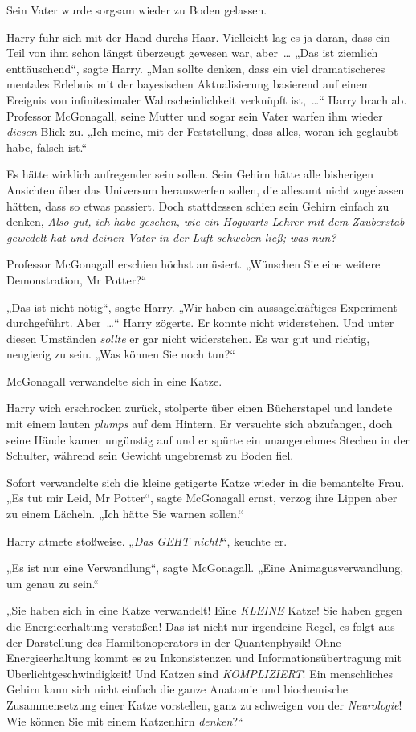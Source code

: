 {Sein Vater wurde sorgsam wieder zu Boden gelassen.

Harry fuhr sich mit der Hand durchs Haar. Vielleicht lag es ja daran, dass ein Teil von ihm schon längst überzeugt gewesen war, aber~… „Das ist ziemlich enttäuschend“, sagte Harry. „Man sollte denken, dass ein viel dramatischeres mentales Erlebnis mit der bayesischen Aktualisierung basierend auf einem Ereignis von infinitesimaler Wahrscheinlichkeit verknüpft ist,~…“ Harry brach ab. Professor McGonagall, seine Mutter und sogar sein Vater warfen ihm wieder \emph{diesen} Blick zu. „Ich meine, mit der Feststellung, dass alles, woran ich geglaubt habe, falsch ist.“

Es hätte wirklich aufregender sein sollen. Sein Gehirn hätte alle bisherigen Ansichten über das Universum herauswerfen sollen, die allesamt nicht zugelassen hätten, dass so etwas passiert. Doch stattdessen schien sein Gehirn einfach zu denken, \emph{Also gut, ich habe gesehen, wie ein Hogwarts-Lehrer mit dem Zauberstab gewedelt hat und deinen Vater in der Luft schweben ließ; was nun?}

Professor McGonagall erschien höchst amüsiert. „Wünschen Sie eine weitere Demonstration, Mr Potter?“

„Das ist nicht nötig“, sagte Harry. „Wir haben ein aussagekräftiges Experiment durchgeführt. Aber~…“ Harry zögerte. Er konnte nicht widerstehen. Und unter diesen Umständen \emph{sollte} er gar nicht widerstehen. Es war gut und richtig, neugierig zu sein. „Was können Sie noch tun?“

McGonagall verwandelte sich in eine Katze.

Harry wich erschrocken zurück, stolperte über einen Bücherstapel und landete mit einem lauten \emph{plumps} auf dem Hintern. Er versuchte sich abzufangen, doch seine Hände kamen ungünstig auf und er spürte ein unangenehmes Stechen in der Schulter, während sein Gewicht ungebremst zu Boden fiel.

Sofort verwandelte sich die kleine getigerte Katze wieder in die bemantelte Frau. „Es tut mir Leid, Mr Potter“, sagte McGonagall ernst, verzog ihre Lippen aber zu einem Lächeln. „Ich hätte Sie warnen sollen.“

Harry atmete stoßweise. „\emph{Das GEHT nicht!}“, keuchte er.

„Es ist nur eine Verwandlung“, sagte McGonagall. „Eine Animagusverwandlung, um genau zu sein.“

„Sie haben sich in eine Katze verwandelt! Eine \emph{KLEINE} Katze! Sie haben gegen die Energieerhaltung verstoßen! Das ist nicht nur irgendeine Regel, es folgt aus der Darstellung des Hamiltonoperators in der Quantenphysik! Ohne Energieerhaltung kommt es zu Inkonsistenzen und Informationsübertragung mit Überlichtgeschwindigkeit! Und Katzen sind \emph{KOMPLIZIERT}! Ein menschliches Gehirn kann sich nicht einfach die ganze Anatomie und biochemische Zusammensetzung einer Katze vorstellen, ganz zu schweigen von der \emph{Neurologie}! Wie können Sie mit einem Katzenhirn \emph{denken}?“

}
